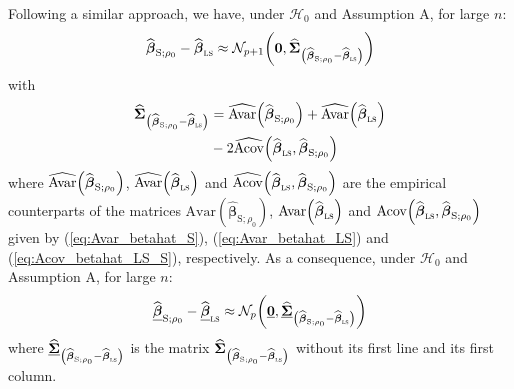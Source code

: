 Following a similar approach, we have, under $\mathcal{H}_{0}$ and Assumption
A, for large $n$:
\[
\sthat{\boldsymbol\beta}_{\mathrm{S};\rho_{0}}-\sthat{\boldsymbol{\beta
}}_{\stsc{LS}}\approx\mathcal{N}_{p+1}\left(  \mathbf{0},\widehat
{\boldsymbol{\Sigma}}_{\left(  \sthat{\boldsymbol\beta}_{\mathrm{S}%
;\rho_{0}}-\sthat{\boldsymbol\beta}_{\stsc{LS}}\right)  }\right)
\]
with
\begin{align}
\sthat{\boldsymbol{\Sigma}}_{\left(  \sthat{\boldsymbol\beta%
}_{\mathrm{S};\rho_{0}}-\sthat{\boldsymbol\beta}_{\stsc{LS}}\right)  }
&  =\sthat{\mathrm{Avar}}\left(  \sthat{\boldsymbol\beta}_{\mathrm{S}%
;\rho_{0}}\right)  +\sthat{\mathrm{Avar}}\left(  \sthat{\boldsymbol{\beta
}}_{\stsc{LS}}\right) \label{eq:Hausman_sigmahat_S-LS}\\
&  -2\sthat{\mathrm{Acov}}\left(  \sthat{\boldsymbol\beta}_{\stsc{LS}%
},\sthat{\boldsymbol\beta}_{\mathrm{S};\rho_{0}}\right) \nonumber
\end{align}
where $\sthat{\mathrm{Avar}}\left(  \sthat{\boldsymbol\beta}%
_{\mathrm{S};\rho_{0}}\right)  $, $\sthat{\mathrm{Avar}}\left(
\sthat{\boldsymbol\beta}_{\stsc{LS}}\right)  $ and $\widehat
{\mathrm{Acov}}\left(  \sthat{\boldsymbol\beta}_{\stsc{LS}}%
,\sthat{\boldsymbol\beta}_{\mathrm{S};\rho_{0}}\right)  $ are the
empirical counterparts of the matrices $\mathrm{Avar}\left(  \widehat
{\boldsymbol\beta}_{\mathrm{S};\rho_{0}}\right)  $, $\mathrm{Avar}\left(
\sthat{\boldsymbol\beta}_{\stsc{LS}}\right)  $ and $\mathrm{Acov}\left(
\sthat{\boldsymbol\beta}_{\stsc{LS}},\sthat{\boldsymbol\beta%
}_{\mathrm{S};\rho_{0}}\right)  $ given by (\ref{eq:Avar_betahat_S}),
(\ref{eq:Avar_betahat_LS}) and (\ref{eq:Acov_betahat_LS_S}), respectively. As
a consequence, under $\mathcal{H}_{0}$ and Assumption A, for large $n$:
\begin{equation}
\sthat{\underline{\boldsymbol\beta}}_{\mathrm{S};\rho_{0}}-\underline
{\sthat{\boldsymbol\beta}}_{\stsc{LS}}\approx\mathcal{N}_{p}\left(
\underline{\mathbf{0}},\sthat{\underline{\boldsymbol{\Sigma}}}_{\left(
\sthat{\boldsymbol\beta}_{\mathrm{S};\rho_{0}}-\sthat{\boldsymbol{\beta
}}_{\stsc{LS}}\right)  }\right)  \label{eq:Hausman_normality_S-LS}%
\end{equation}
where $\sthat{\underline{\boldsymbol{\Sigma}}}_{\left(  \widehat
{\boldsymbol\beta}_{\mathrm{S};\rho_{0}}-\sthat{\boldsymbol\beta%
}_{\stsc{LS}}\right)  }$ is the matrix $\sthat{\boldsymbol{\Sigma}%
}_{\left(  \sthat{\boldsymbol\beta}_{\mathrm{S};\rho_{0}}-\widehat
{\boldsymbol\beta}_{\stsc{LS}}\right)  }$ without its first line and its
first column.

